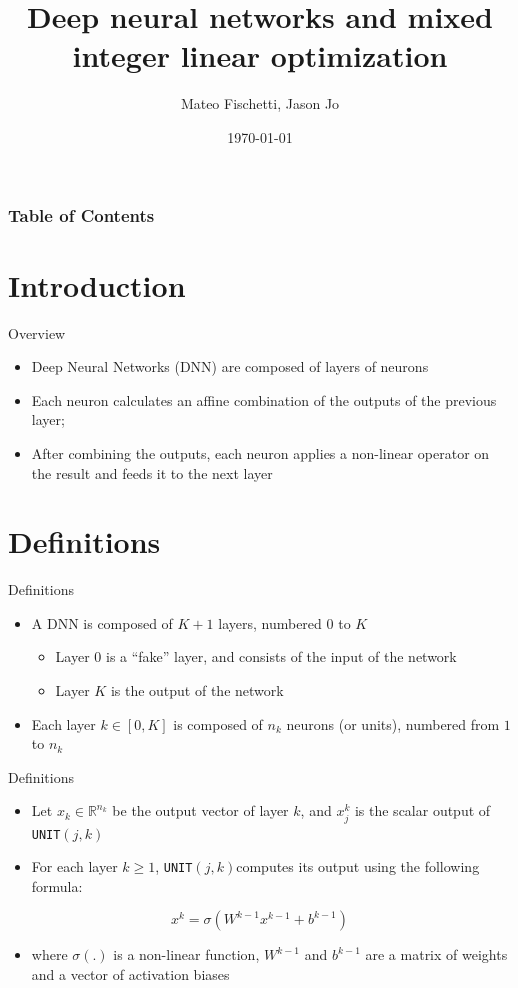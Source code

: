 \documentclass{beamer}
\title[DNN and MILP]{Deep neural networks and mixed integer linear optimization}
\author{Mateo Fischetti, Jason Jo}
\date{\today}
\newcommand{\UNIT}{\texttt{UNIT}$(j,k)$}
\begin{document}
\begin{frame}
\titlepage
\end{frame}

\begin{frame}
\frametitle{Table of Contents}
\tableofcontents
\end{frame}

\section{Introduction}
\begin{frame}{Overview}
  \begin{itemize}
  \item Deep Neural Networks (DNN) are composed of layers of neurons
  \item Each neuron calculates an affine combination of the outputs of the previous layer;
  \item After combining the outputs, each neuron applies a non-linear operator on the result and feeds it to the next layer
  \end{itemize}
\end{frame}

\section{Definitions}
\begin{frame}{Definitions}
  \begin{itemize}
  \item A DNN is composed of $K+1$ layers, numbered $0$ to $K$
    \begin{itemize}
    \item Layer $0$ is a ``fake'' layer, and consists of the input of the network
    \item Layer $K$ is the output of the network
    \end{itemize}
  \item Each layer $k \in [0, K]$ is composed of $n_k$ neurons (or units), numbered from $1$ to $n_k$
  \end{itemize}
\end{frame}

\begin{frame}{Definitions}
  \begin{itemize}
  \item Let $x_k \in \mathbb{R}^{n_k}$ be the output vector of layer $k$, and $x_j^k$ is the scalar output of \UNIT
  \item For each layer $k \geq 1$, \UNIT computes its output using the following formula:
  \end{itemize}
  $$
  x^k = \sigma(W^{k-1} x^{k-1} + b^{k-1})
  $$
  \begin{itemize}
  \item where $\sigma(.)$ is a non-linear function, $W^{k-1}$ and $b^{k-1}$ are a matrix of weights and a vector of activation biases
  \end{itemize}
\end{frame}
\end{document}
